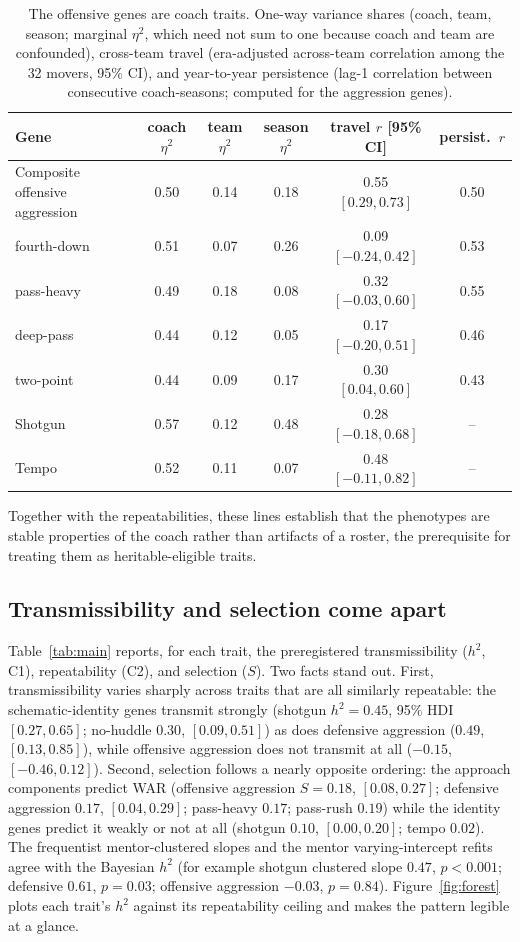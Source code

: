 \documentclass[
  journal=ehs,
  manuscript=article,
  year=2026,
  volume=8,
]{cup-journal}
\begin{document}
\begin{table}[t]
\centering
\caption{The offensive genes are coach traits. One-way variance shares (coach, team,
season; marginal $\eta^2$, which need not sum to one because coach and team are
confounded), cross-team travel (era-adjusted across-team correlation among the 32
movers, 95\% CI), and year-to-year persistence (lag-1 correlation between consecutive
coach-seasons; computed for the aggression genes).}
\label{tab:validity}
\begin{tabular}{lccccc}
\toprule
Gene & coach $\eta^2$ & team $\eta^2$ & season $\eta^2$ & travel $r$ [95\% CI] & persist.\ $r$ \\
\midrule
Composite offensive aggression & 0.50 & 0.14 & 0.18 & 0.55 $[0.29,0.73]$ & 0.50 \\
\quad fourth-down & 0.51 & 0.07 & 0.26 & 0.09 $[-0.24,0.42]$ & 0.53 \\
\quad pass-heavy  & 0.49 & 0.18 & 0.08 & 0.32 $[-0.03,0.60]$ & 0.55 \\
\quad deep-pass   & 0.44 & 0.12 & 0.05 & 0.17 $[-0.20,0.51]$ & 0.46 \\
\quad two-point   & 0.44 & 0.09 & 0.17 & 0.30 $[0.04,0.60]$ & 0.43 \\
Shotgun & 0.57 & 0.12 & 0.48 & 0.28 $[-0.18,0.68]$ & -- \\
Tempo   & 0.52 & 0.11 & 0.07 & 0.48 $[-0.11,0.82]$ & -- \\
\bottomrule
\end{tabular}
\end{table}

Together with the repeatabilities, these lines establish that the phenotypes are
stable properties of the coach rather than artifacts of a roster, the prerequisite
for treating them as heritable-eligible traits.

\subsection{Transmissibility and selection come apart}
Table~\ref{tab:main} reports, for each trait, the preregistered transmissibility
($h^{2}$, C1), repeatability (C2), and selection ($S$). Two facts stand out. First,
transmissibility varies sharply across traits that are all similarly repeatable:
the schematic-identity genes transmit strongly (shotgun $h^{2}=0.45$, 95\% HDI
$[0.27,0.65]$; no-huddle $0.30$, $[0.09,0.51]$) as does defensive aggression
($0.49$, $[0.13,0.85]$), while offensive aggression does not transmit at all
($-0.15$, $[-0.46,0.12]$). Second, selection follows a nearly opposite ordering:
the approach components predict WAR (offensive aggression $S=0.18$, $[0.08,0.27]$;
defensive aggression $0.17$, $[0.04,0.29]$; pass-heavy $0.17$; pass-rush $0.19$)
while the identity genes predict it weakly or not at all (shotgun $0.10$,
$[0.00,0.20]$; tempo $0.02$). The
frequentist mentor-clustered slopes and the mentor varying-intercept refits agree
with the Bayesian $h^{2}$ (for example shotgun clustered slope $0.47$, $p<0.001$;
defensive $0.61$, $p=0.03$; offensive aggression $-0.03$, $p=0.84$).
Figure~\ref{fig:forest} plots each trait's $h^{2}$ against its repeatability ceiling
and makes the pattern legible at a glance.
\end{document}
